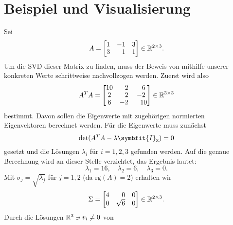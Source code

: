 \section{Beispiel und Visualisierung}
\begin{example}\label{ex:svd}
    Sei 
    \begin{equation*}
        A =
        \begin{bmatrix}
            1 & -1 & 3 \\
            3 & \phantom{-}1 & 1
        \end{bmatrix} \in \R^{2 \times 3}.
    \end{equation*}
    Um die SVD dieser Matrix zu finden, muss der Beweis von  mithilfe unserer konkreten Werte schrittweise nachvollzogen werden.
    Zuerst wird also
    \begin{equation*}
        \renewcommand{\arraystretch}{0.9}
        A^{T}A = 
        \begin{bmatrix}
            10 & \phantom{-}2 & \phantom{-}6 \\
            2 & \phantom{-}2 & -2 \\
            6 & -2 & \phantom{-}10
        \end{bmatrix} \in \R^{3 \times 3}
    \end{equation*}
    bestimmt. 
    Davon sollen die Eigenwerte mit zugehörigen normierten Eigenvektoren berechnet werden.
    Für die Eigenwerte muss zunächst
    \begin{equation*}
        \det(A^{T}A - \lambda \symbfit{I}_{3}) = 0
    \end{equation*}    
    gesetzt und die Lösungen \(\lambda_i\) für \(i =1,2,3\) gefunden werden.
    Auf die genaue Berechnung wird an dieser Stelle verzichtet, das Ergebnis lautet:
    \begin{equation*}
        \lambda_1 = 16, \quad 
        \lambda_2 = 6, \quad
        \lambda_3 = 0.
    \end{equation*}
    Mit \(\sigma_j = \sqrt{\lambda_j}\) für \(j = 1, 2\) (da \(\text{rg}(A)=2\)) erhalten wir
    \begin{equation*}
        \renewcommand{\arraystretch}{0.9}
        \Sigma=
        \begin{bmatrix}
            4 & \phantom{\surd}0 & 0 \\
            0 & \sqrt{6} & 0
        \end{bmatrix} \in \R^{2 \times 3}.
    \end{equation*}
    Durch die Lösungen \(\mathbb{R}^{3} \ni v_i \neq 0\) von

\end{example}
